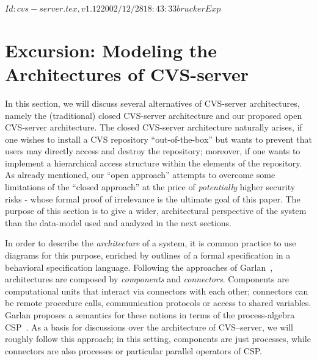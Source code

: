 \rcsInfo $Id: cvs-server.tex,v 1.12 2002/12/28 18:43:33 brucker Exp $

\chapter{Excursion: Modeling the Architectures of CVS-server}
In this section, we will discuss several alternatives of CVS-server
architectures, namely the (traditional) closed CVS-server architecture and our
proposed open CVS-server architecture.  The closed CVS-server architecture
naturally arises, if one wishes to install a CVS repository ``out-of-the-box'' but
wants to prevent that users may directly access and destroy the repository;
moreover, if one wants to implement a hierarchical access structure within the
elements of the repository. As already mentioned, our ``open approach'' attempts
to overcome some limitations of the ``closed approach'' at the price of
\emph{potentially} higher security risks - whose formal proof of irrelevance is
the ultimate goal of this paper. The purpose of this section is to give a wider,
architectural perspective of the system than the data-model used and analyzed in
the next sections.

In order to describe the \emph{architecture} of a
system, it is common practice to use diagrams for this purpose,
enriched by outlines of a formal specification in a behavioral
specification language. Following the approaches of
Garlan~\cite{garlan:arch:93,shaw:arch:96}, architectures are composed
by \emph{components} and
\emph{connectors}. Components are computational units
that interact via connectors with each other; connectors can be remote
procedure calls, communication protocols or access to shared
variables. Garlan proposes a semantics for these notions in terms of
the process-algebra CSP~\cite{roscoe:csp:98}. As a basis for
discussions over the architecture of CVS--server, we will roughly
follow this approach; in this setting, components are just processes,
while connectors are also processes or particular parallel operators
of CSP.

